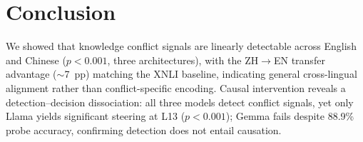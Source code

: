 \vspace{-8pt}
\section{Conclusion}
\label{sec:conclusion}
\vspace{-4pt}

We showed that knowledge conflict signals are linearly detectable across English and Chinese ($p < 0.001$, three architectures), with the ZH$\to$EN transfer advantage (${\sim}$7~pp) matching the XNLI baseline, indicating general cross-lingual alignment rather than conflict-specific encoding.
Causal intervention reveals a detection--decision dissociation: all three models detect conflict signals, yet only Llama yields significant steering at L13 ($p < 0.001$); Gemma fails despite 88.9\% probe accuracy, confirming detection does not entail causation.
